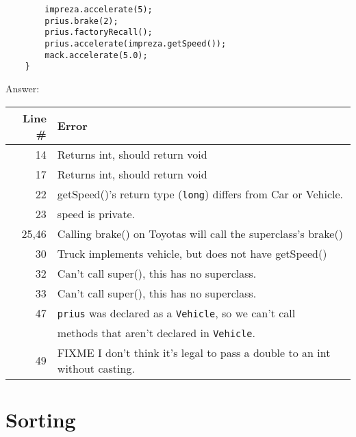 \documentclass[11pt]{article}
\newenvironment{answer}{\large\lstset{basicstyle=\large\ttfamily}\color{white} \small{Answer:}\large}{}
\newenvironment{answer}{\large\lstset{basicstyle=\large\ttfamily}\color{red} \small{Answer:}\large}{}
\begin{document}
\begin{enumerate}
\begin{lstlisting}
		impreza.accelerate(5);
		prius.brake(2);
		prius.factoryRecall();
		prius.accelerate(impreza.getSpeed());
		mack.accelerate(5.0);
	}
\end{lstlisting}
\begin{answer}
    \begin{tabular}{r l} %
    Line \# & Error \\\hline
    14  	& Returns int, should return void\\
    17  	& Returns int, should return void\\
    22  	& getSpeed()'s return type ({\tt long}) differs from Car or Vehicle.\\
    23  	& speed is private.\\
    25,46	& Calling brake() on Toyotas will call the superclass's brake()\\
    30  	& Truck implements vehicle, but does not have getSpeed()\\
    32  	& Can't call super(), this has no superclass.\\
    33  	& Can't call super(), this has no superclass.\\
    47  	& {\tt prius} was declared as a {\tt Vehicle}, so we can't call\\
    ~  		& methods that aren't declared in {\tt Vehicle}.\\
    49  	& FIXME I don't think it's legal to pass a double to an int without casting.
    \end{tabular}
\end{answer}


\section*{Sorting}



\end{enumerate}
\end{document}
